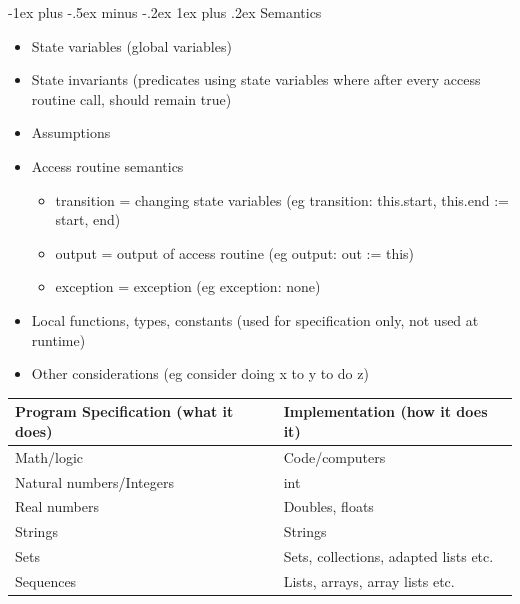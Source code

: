 \documentclass[letterpaper, 8pt]{extarticle}
\makeatletter
\renewcommand{\subsubsection}{\@startsection{subsubsection}{3}{0mm}%
                                {-1ex plus -.5ex minus -.2ex}%
                                {1ex plus .2ex}%
                                {\normalfont\tiny\bfseries}}
\makeatother
\begin{document}
\begin{multicols*}{5}
  \subsubsection{Semantics}
  \begin{itemize}
    \item State variables (global variables)
    \item State invariants (predicates using state variables where after every access routine call, should remain true)
    \item Assumptions
    \item Access routine semantics
    \begin{itemize}
        \item transition = changing state variables (eg transition: this.start, this.end := start, end)
        \item output = output of access routine (eg output: out := this)
        \item exception = exception (eg exception: none)
    \end{itemize}
    \item Local functions, types, constants (used for specification only, not used at runtime)
    \item Other considerations (eg consider doing x to y to do z)
  \end{itemize}
  \begin{tabulary}{\linewidth}{@{}LL@{}}
  \toprule
    Program Specification (what it does) & Implementation (how it does it) \\ \midrule
    Math/logic & Code/computers \\
    Natural numbers/Integers & int \\
    Real numbers & Doubles, floats \\
    Strings & Strings \\
    Sets & Sets, collections, adapted lists etc. \\
    Sequences & Lists, arrays, array lists etc. \\
    \bottomrule
  \end{tabulary}


\end{multicols*}
\end{document}
